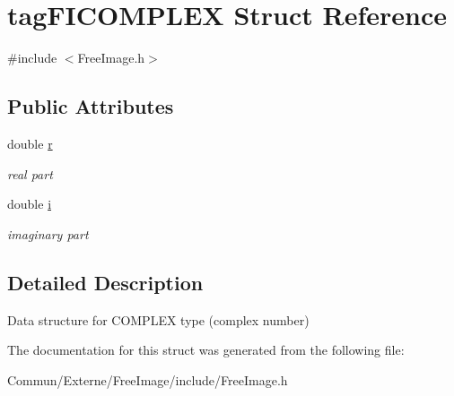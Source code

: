 \hypertarget{structtag_f_i_c_o_m_p_l_e_x}{}\section{tag\+F\+I\+C\+O\+M\+P\+L\+EX Struct Reference}
\label{structtag_f_i_c_o_m_p_l_e_x}


{\ttfamily \#include $<$Free\+Image.\+h$>$}

\subsection*{Public Attributes}
\begin{DoxyCompactItemize}
\item 
double \hyperlink{structtag_f_i_c_o_m_p_l_e_x_a448818f3de56c81064bdcb1ba78a7ead}{r}\hypertarget{structtag_f_i_c_o_m_p_l_e_x_a448818f3de56c81064bdcb1ba78a7ead}{}\label{structtag_f_i_c_o_m_p_l_e_x_a448818f3de56c81064bdcb1ba78a7ead}

\begin{DoxyCompactList}\small\item\em real part \end{DoxyCompactList}\item 
double \hyperlink{structtag_f_i_c_o_m_p_l_e_x_ad2cc2cc6d32c1e5496f2c77e185d8218}{i}\hypertarget{structtag_f_i_c_o_m_p_l_e_x_ad2cc2cc6d32c1e5496f2c77e185d8218}{}\label{structtag_f_i_c_o_m_p_l_e_x_ad2cc2cc6d32c1e5496f2c77e185d8218}

\begin{DoxyCompactList}\small\item\em imaginary part \end{DoxyCompactList}\end{DoxyCompactItemize}


\subsection{Detailed Description}
Data structure for C\+O\+M\+P\+L\+EX type (complex number) 

The documentation for this struct was generated from the following file\+:\begin{DoxyCompactItemize}
\item 
Commun/\+Externe/\+Free\+Image/include/Free\+Image.\+h\end{DoxyCompactItemize}
